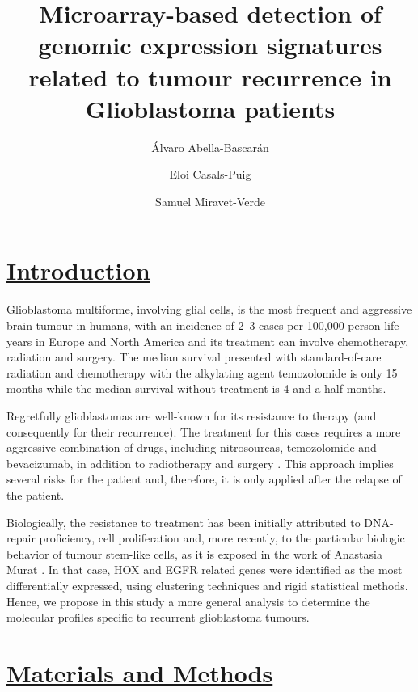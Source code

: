 \documentclass[9pt,twocolumn,twoside]{gsajnl}
\title{Microarray-based detection of genomic expression signatures related to tumour recurrence in Glioblastoma patients}
\author[$\ast$,1]{Álvaro Abella-Bascarán}
\author[$\ast$]{Eloi Casals-Puig}
\author[$\ast$]{Samuel Miravet-Verde}
\affil[$\ast$]{Pompeu Fabra University, Barcelona (Spain)}
\begin{document}
\maketitle
\thispagestyle{firststyle}
\marginmark
\firstpagefootnote
{}

\vspace{-1cm}
\section*{\underline{Introduction}}



Glioblastoma multiforme, involving glial cells, is the most frequent and aggressive brain tumour in humans, with an incidence of 2–3 cases per 100,000 person life-years in Europe and North America \citep{Bleeker2012} and its treatment can involve chemotherapy, radiation and surgery. The median survival presented with standard-of-care radiation and chemotherapy with the alkylating agent temozolomide is only 15 months  \citep{Johnson2012} while the median survival without treatment is 4 and a half months. 

Regretfully glioblastomas are well-known for its resistance to therapy (and consequently for their recurrence). The treatment for this cases requires a more aggressive combination of drugs, including nitrosoureas, temozolomide and bevacizumab, in addition to radiotherapy and surgery \citep{Weller2013}. This approach implies several risks for the patient and, therefore, it is only applied after the relapse of the patient.

Biologically, the resistance to treatment has been initially attributed to DNA-repair proficiency, cell proliferation and, more recently, to the particular biologic behavior of tumour stem-like cells, as it is exposed in the work of Anastasia Murat \citep{Murat2008}. In that case, HOX and EGFR related genes were identified as the most differentially expressed, using clustering techniques and rigid statistical methods. Hence, we propose in this study a more general analysis to determine the molecular profiles specific to recurrent glioblastoma tumours.

\section*{\underline{Materials and Methods}}
\end{document}
